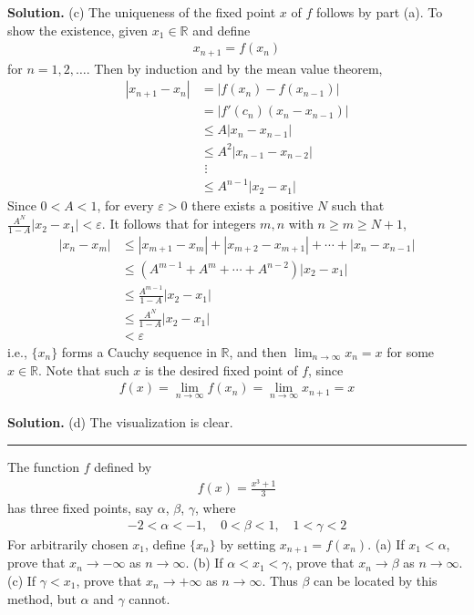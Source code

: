 \documentclass[12pt]{article}
\theoremstyle{definition}
\begin{document}
\smallskip
\noindent\textbf{Solution.}\quad
(c) The uniqueness of the fixed point $x$ of $f$ follows by part (a). To show the existence, given $x_1\in \mathbb{R}$ and define
\begin{align*}
x_{n+1}=f(x_n)
\end{align*}
for $n=1,2,\ldots$. Then by induction and by the mean value theorem,
\begin{align*}
\left\vert x_{n+1}-x_n\right\vert
&=\left\vert f(x_n)-f(x_{n-1})\right\vert \\
&=\left\vert f'(c_n)\left(x_n-x_{n-1}\right)\right\vert \\
&\le A\left\vert x_n-x_{n-1}\right\vert \\
&\le A^2\left\vert x_{n-1}-x_{n-2}\right\vert \\
&\,\,\vdots \\
&\le A^{n-1}\left\vert x_2-x_1\right\vert
\end{align*}
Since $0<A<1$, for every $\varepsilon>0$ there exists a positive $N$ such that $\frac{A^{N}}{1-A}\left\vert x_2-x_1\right\vert<\varepsilon$. It follows that for integers $m,n$ with $n\ge m\ge N+1$,
\begin{align*}
\left\vert x_n-x_m\right\vert
&\le\left\vert x_{m+1}-x_m\right\vert+\left\vert x_{m+2}-x_{m+1}\right\vert+\cdots+\left\vert x_n-x_{n-1}\right\vert \\
&\le\left(A^{m-1}+A^m+\cdots+A^{n-2}\right)\left\vert x_2-x_1\right\vert \\
&\le \frac{A^{m-1}}{1-A}\left\vert x_2-x_1\right\vert \\
&\le \frac{A^{N}}{1-A}\left\vert x_2-x_1\right\vert \\
&<\varepsilon
\end{align*}
i.e., $\{x_n\}$ forms a Cauchy sequence in $\mathbb{R}$, and then $\lim_{n\to\infty}x_n=x$ for some $x\in \mathbb{R}$. Note that such $x$ is the desired fixed point of $f$, since
\begin{align*}
f(x)
=\lim_{n\to\infty}f(x_n)
=\lim_{n\to\infty}x_{n+1}
=x
\end{align*}

\smallskip
\noindent\textbf{Solution.}\quad
(d) The visualization is clear.



\bigskip\noindent\hrule\bigskip

The function $f$ defined by
\begin{align*}
f(x)=\frac{x^3+1}{3}
\end{align*}
has three fixed points, say $\alpha$, $\beta$, $\gamma$, where
\begin{align*}
-2<\alpha<-1,\quad
0<\beta<1,\quad
1<\gamma<2
\end{align*}
For arbitrarily chosen $x_1$, define $\{x_n\}$ by setting $x_{n+1}=f(x_n)$.
(a) If $x_1<\alpha$, prove that $x_n\to-\infty$ as $n\to\infty$.
(b) If $\alpha<x_1<\gamma$, prove that $x_n\to\beta$ as $n\to\infty$.
(c) If $\gamma<x_1$, prove that $x_n\to+\infty$ as $n\to\infty$.
Thus $\beta$ can be located by this method, but $\alpha$ and $\gamma$ cannot.
\end{document}
